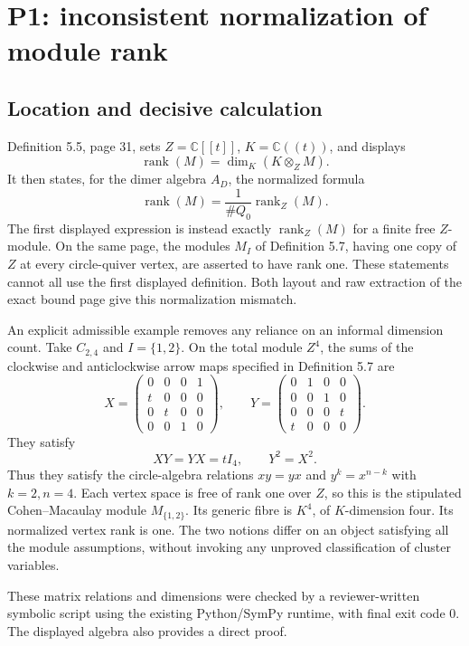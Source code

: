 \documentclass[10pt]{article}
\begin{document}
\section*{P1: inconsistent normalization of module rank}
\subsection*{Location and decisive calculation}
Definition 5.5, page 31, sets \(Z=\mathbb C[[t]]\), \(K=\mathbb C((t))\), and displays \[\operatorname{rank}(M)=\dim_K(K\otimes_ZM).\] It then states, for the dimer algebra \(A_D\), the normalized formula \[\operatorname{rank}(M)=\frac{1}{\#Q_0}\operatorname{rank}_Z(M).\] The first displayed expression is instead exactly \(\operatorname{rank}_Z(M)\) for a finite free \(Z\)-module. On the same page, the modules \(M_I\) of Definition 5.7, having one copy of \(Z\) at every circle-quiver vertex, are asserted to have rank one. These statements cannot all use the first displayed definition. Both layout and raw extraction of the exact bound page give this normalization mismatch.\par
An explicit admissible example removes any reliance on an informal dimension count. Take \(C_{2,4}\) and \(I=\{1,2\}\). On the total module \(Z^4\), the sums of the clockwise and anticlockwise arrow maps specified in Definition 5.7 are \[X=\begin{pmatrix}
0&0&0&1\\ t&0&0&0\\0&t&0&0\\0&0&1&0
\end{pmatrix},
\qquad
Y=\begin{pmatrix}
0&1&0&0\\0&0&1&0\\0&0&0&t\\t&0&0&0
\end{pmatrix}.\] They satisfy \[XY=YX=tI_4,\qquad Y^2=X^2.\] Thus they satisfy the circle-algebra relations \(xy=yx\) and \(y^k=x^{n-k}\) with \(k=2,n=4\). Each vertex space is free of rank one over \(Z\), so this is the stipulated Cohen–Macaulay module \(M_{\{1,2\}}\). Its generic fibre is \(K^4\), of \(K\)-dimension four. Its normalized vertex rank is one. The two notions differ on an object satisfying all the module assumptions, without invoking any unproved classification of cluster variables.\par
These matrix relations and dimensions were checked by a reviewer-written symbolic script using the existing Python/SymPy runtime, with final exit code 0. The displayed algebra also provides a direct proof.\par
\end{document}
